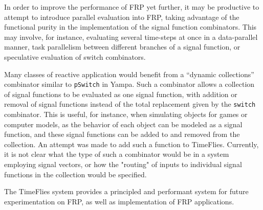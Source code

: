 In order to improve the performance of FRP yet further, it may be productive to attempt
to introduce parallel evaluation into FRP, taking advantage of the functional purity in
the implementation of the signal function combinators. This may involve, for instance,
evaluating several time-steps at once in a data-parallel manner, task parallelism
between different branches of a signal function, or speculative evaluation of switch
combinators.

Many classes of reactive application would benefit from a ``dynamic collections'' combinator
similar to {\tt pSwitch} in Yampa. Such a combinator allows a collection of signal functions
to be evaluated as one signal function, with addition or removal of signal functions instead
of the total replacement given by the {\tt switch} combinator. This is useful, for instance,
when simulating objects for games or computer models, as the behavior of each object can be
modeled as a signal function, and these signal functions can be added to and removed from the
collection. An attempt was made to add such a function to TimeFlies. Currently,
it is not clear what the type of such a combinator would be in a system
employing signal vectors, or how the "routing" of inputs to individual signal
functions in the collection would be specified.

The TimeFlies system provides a principled and performant system for future experimentation
on FRP, as well as implementation of FRP applications.
